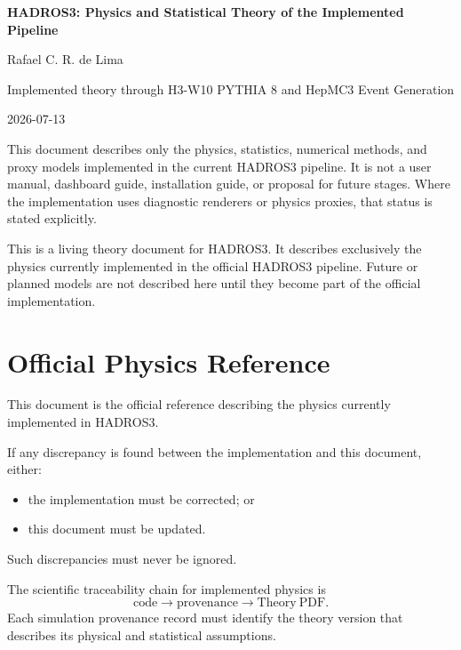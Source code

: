 \documentclass[11pt,a4paper]{report}
\numberwithin{equation}{chapter}
\newcommand{\TheoryGenerationDate}{2026-07-13}
\begin{document}
\begin{titlepage}
\centering
\vspace*{2.0cm}
{\Huge\bfseries HADROS3: Physics and Statistical Theory of the Implemented Pipeline\par}
\vspace{1.0cm}
{\Large Rafael C. R. de Lima\par}
\vfill
{\large Implemented theory through H3-W10 PYTHIA 8 and HepMC3 Event Generation\par}
\vspace{0.5cm}
{\large \TheoryGenerationDate\par}
\vfill
\begin{minipage}{0.82\textwidth}
\small
This document describes only the physics, statistics, numerical methods, and
proxy models implemented in the current HADROS3 pipeline. It is not a user
manual, dashboard guide, installation guide, or proposal for future stages.
Where the implementation uses diagnostic renderers or physics proxies, that
status is stated explicitly.

This is a living theory document for HADROS3. It describes exclusively the
physics currently implemented in the official HADROS3 pipeline. Future or
planned models are not described here until they become part of the official
implementation.
\end{minipage}
\end{titlepage}

\chapter*{Official Physics Reference}

This document is the official reference describing the physics currently
implemented in HADROS3.

If any discrepancy is found between the implementation and this document, either:
\begin{itemize}
\item the implementation must be corrected; or
\item this document must be updated.
\end{itemize}
Such discrepancies must never be ignored.

The scientific traceability chain for implemented physics is
\begin{equation}
\mathrm{code}
\rightarrow
\mathrm{provenance}
\rightarrow
\mathrm{Theory\ PDF}.
\end{equation}
Each simulation provenance record must identify the theory version that
describes its physical and statistical assumptions.
\end{document}

